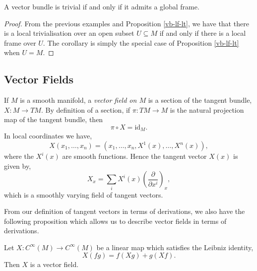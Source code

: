 \begin{corollary}
A vector bundle is trivial if and only if it admits a global frame.
\end{corollary}
\begin{proof}
From the previous examples and Proposition \ref{vb-lf-lt}, we have that there is a local trivialisation over an open subset $U\subseteq M$ if and only if there is a local frame over $U$. The corollary is simply the special case of Proposition \ref{vb-lf-lt} when $U=M$.
\end{proof}
\pagebreak
\subsection{Vector Fields}
\begin{definition}
If $M$ is a smooth manifold, a \textit{vector field on $M$} is a section of the tangent bundle, $X:M\to TM$. By definition of a section, if $\pi:TM\to M$ is the natural projection map of the tangent bundle, then
\[
\pi\circ X=\mathrm{id}_M.
\] 
In local coordinates we have,
\[
X(x_1,\ldots,x_n)=(x_1,\ldots,x_n,X^1(x),\ldots,X^n(x)),
\]
where the $X^i(x)$ are smooth functions. Hence the tangent vector $X(x)$ is given by,
\begin{equation}
X_x=\sum_iX^i(x)\left(\frac{\partial}{\partial x^i}\right)_x,
\label{eq:vect-local}
\end{equation}
which is a smoothly varying field of tangent vectors.
\end{definition}
From our definition of tangent vectors in terms of derivations, we also have the following proposition which allows us to describe vector fields in terms of derivations.
\begin{proposition}
Let $X:C^{\infty}(M)\to C^{\infty}(M)$ be a linear map which satisfies the Leibniz identity,
\[
X(fg)=f(Xg)+g(Xf).
\]
Then $X$ is a vector field.
\end{proposition}
